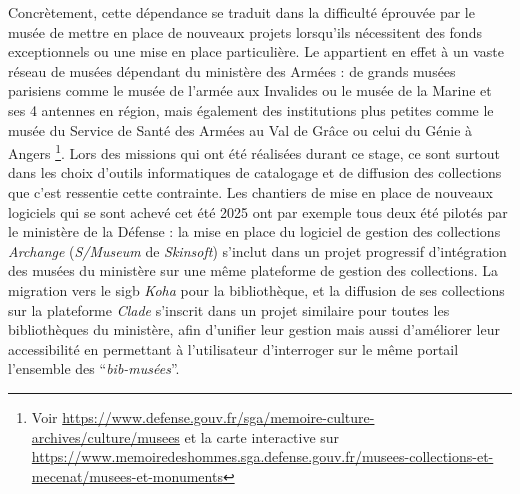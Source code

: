 Concrètement, cette dépendance se traduit dans la difficulté éprouvée par le musée de mettre en place de nouveaux projets lorsqu'ils nécessitent des fonds exceptionnels ou une mise en place particulière. Le \mae appartient en effet à un vaste réseau de musées dépendant du ministère des Armées : de grands musées parisiens comme le musée de l'armée aux Invalides ou le musée de la Marine et ses 4 antennes en région, mais également des institutions plus petites comme le musée du Service de Santé des Armées au Val de Grâce ou celui du Génie à Angers
	\footnote{Voir \url{https://www.defense.gouv.fr/sga/memoire-culture-archives/culture/musees} et la carte interactive sur \url{https://www.memoiredeshommes.sga.defense.gouv.fr/musees-collections-et-mecenat/musees-et-monuments}}. 
Lors des missions qui ont été réalisées durant ce stage, ce sont surtout dans les choix d'outils informatiques de catalogage et de diffusion des collections que c'est ressentie cette contrainte. Les chantiers de mise en place de nouveaux logiciels qui se sont achevé cet été 2025 ont par exemple tous deux été pilotés par le ministère de la Défense : la mise en place du logiciel de gestion des collections \textit{Archange} (\textit{S/Museum} de \textit{Skinsoft}) s'inclut dans un projet progressif d'intégration des musées du ministère sur une même plateforme de gestion des collections. La migration vers le \ac{sigb} \textit{Koha} pour la bibliothèque, et la diffusion de ses collections sur la plateforme \textit{Clade} s'inscrit dans un projet similaire pour toutes les bibliothèques du ministère, afin d'unifier leur gestion mais aussi d'améliorer leur accessibilité en permettant à l'utilisateur d'interroger sur le même portail l'ensemble des \enquote{\textit{bib-musées}}.

